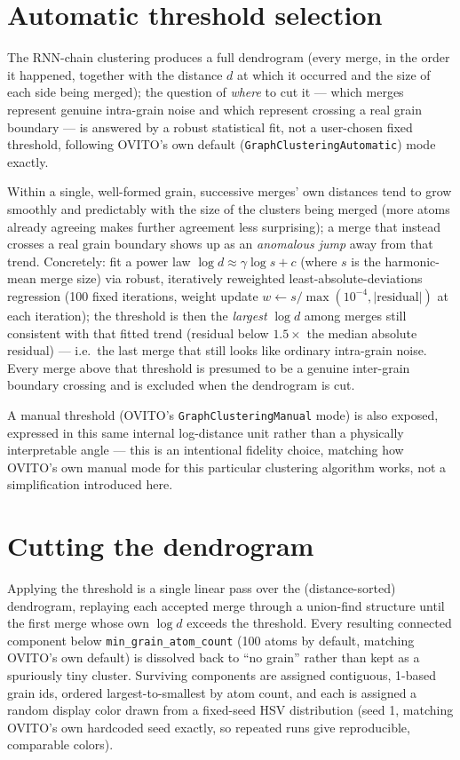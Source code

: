\documentclass[11pt,a4paper]{article}
\newcommand{\field}[1]{\texttt{#1}}
\newcommand{\code}[1]{\texttt{#1}}
\begin{document}
\section{Automatic threshold selection}
\label{sec:threshold}

The RNN-chain clustering produces a full dendrogram (every merge, in the order it happened,
together with the distance $d$ at which it occurred and the size of each side being merged); the
question of \emph{where} to cut it — which merges represent genuine intra-grain noise and which
represent crossing a real grain boundary — is answered by a robust statistical fit, not a
user-chosen fixed threshold, following OVITO's own default (\code{GraphClusteringAutomatic}) mode
exactly.

Within a single, well-formed grain, successive merges' own distances tend to grow smoothly and
predictably with the size of the clusters being merged (more atoms already agreeing makes further
agreement less surprising); a merge that instead crosses a real grain boundary shows up as an
\emph{anomalous jump} away from that trend. Concretely: fit a power law
$\log d \approx \gamma \log s + c$ (where $s$ is the harmonic-mean merge size) via robust,
iteratively reweighted least-absolute-deviations regression (100 fixed iterations, weight update
$w \gets s / \max(10^{-4}, |\text{residual}|)$ at each iteration); the threshold is then the
\emph{largest} $\log d$ among merges still consistent with that fitted trend (residual below
$1.5\times$ the median absolute residual) — i.e.\ the last merge that still looks like ordinary
intra-grain noise. Every merge above that threshold is presumed to be a genuine inter-grain
boundary crossing and is excluded when the dendrogram is cut.

A manual threshold (OVITO's \code{GraphClusteringManual} mode) is also exposed, expressed in this
same internal log-distance unit rather than a physically interpretable angle — this is an
intentional fidelity choice, matching how OVITO's own manual mode for this particular clustering
algorithm works, not a simplification introduced here.

\section{Cutting the dendrogram}

Applying the threshold is a single linear pass over the (distance-sorted) dendrogram, replaying each
accepted merge through a union-find structure until the first merge whose own $\log d$ exceeds the
threshold. Every resulting connected component below \field{min\_grain\_atom\_count} (100 atoms by
default, matching OVITO's own default) is dissolved back to ``no grain'' rather than kept as a
spuriously tiny cluster. Surviving components are assigned contiguous, 1-based grain ids, ordered
largest-to-smallest by atom count, and each is assigned a random display color drawn from a
fixed-seed HSV distribution (seed 1, matching OVITO's own hardcoded seed exactly, so repeated runs
give reproducible, comparable colors).
\end{document}
